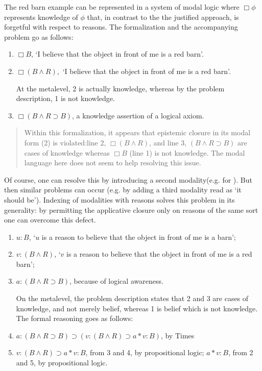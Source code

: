 The red barn example can be represented in a system of modal logic where $\Box \phi$ represents knowledge of $\phi$ that, in contrast to the the justified approach, is forgetful with respect to reasons. The formalization and the accompanying problem go as follows:

\begin{enumerate}
    \item $\Box B$, ‘I believe that the object in front of me is a red barn’.
    \item  $\Box(B \wedge R),$ ‘I believe that the object in front of me is a red barn’. 

At the metalevel, 2 is actually knowledge, whereas by the problem description, 1 is not knowledge.

   \item $\Box(B\wedge R\supset B)$, a knowledge assertion of a logical axiom.
	\end{enumerate}
\begin{quote}	
Within this formalization, it appears that epistemic closure in its modal form (2) is violated:line 2, $\Box(B \wedge R )$, and line 3, $(B \wedge R \supset B)$ are cases of knowledge whereas $\Box B$ (line 1) is not knowledge. The modal language here does not seem to help resolving this issue.
\end{quote}
Of course, one can resolve this by introducing a second modality(e.g. for ). But then similar problems can occur (e.g. by adding a third modality read as `it should be'). Indexing of modalities with reasons solves this problem in its generality: by permitting the applicative closure only on reasons of the same sort one can overcome this defect.
\begin{enumerate}
   \item $u:B$, ‘$u$ is a reason to believe that the object in front of me is a barn’;
   \item $v:(B \wedge R)$, ‘$v$ is a reason to believe that the object in front of me is a red barn’;
    \item $a:(B \wedge R \supset B)$, because of logical awareness.


 On the metalevel, the problem description states that 2 and 3 are cases of knowledge, and not merely belief, whereas 1 is belief which is not knowledge. 
 The formal reasoning goes as follows:

    \item $a:(B \wedge R \supset B)\supset(v:(B \wedge R) \supset  a*v:B)$, by {\sf Times} 
    \item $v:(B \wedge R) \supset a*v:B$, from 3 and 4, by propositional logic;
    $a*v:B$, from 2 and 5, by propositional logic.

\end{enumerate}
